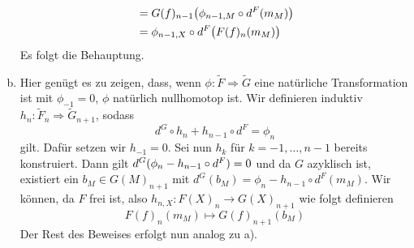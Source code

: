 \begin{beweis}
\begin{enumerate}[a)]
\begin{align}
			&= G(f)_{n-1} \enbrace*{\phi_{n-1,M} \circ d^F(m_M)} \\
			&= \phi_{n-1,X} \circ d^F \enbrace[\big]{F(f)_{n} (m_M)}
		\end{align}
		Es folgt die Behauptung.
		\item Hier genügt es zu zeigen, dass, wenn $\phi \colon \tilde{F} \Rightarrow \tilde{G}$ eine natürliche Transformation ist mit $\phi_{-1}=0$, $\phi$ natürlich nullhomotop ist.
		Wir definieren induktiv $h_n \colon \tilde{F}_n \Rightarrow \tilde{G}_{n+1}$, sodass 
		\[
			d^G \circ h_n + h_{n-1} \circ d^F = \phi_n
		\]
		gilt.
		Dafür setzen wir $h_{-1} =0$.
		Sei nun $h_k$ für $k=-1, \ldots , n-1$ bereits konstruiert.
		Dann gilt $d^G (\phi_n - h_{n-1} \circ d^F) =0$ und da $G$ azyklisch ist, existiert ein $b_M \in G(M)_{n+1}$ mit $d^G(b_M) = \phi_n - h_{n-1} \circ d^F(m_M)$.
		Wir können, da $F$ frei ist, also $h_{n,X} \colon F(X)_n \to G(X)_{n+1}$ wie folgt definieren
		\[
			F(f)_n(m_M) \longmapsto G(f)_{n+1}(b_M)
		\]
		Der Rest des Beweises erfolgt nun analog zu a).\qedhere
	\end{enumerate}
\end{beweis}













